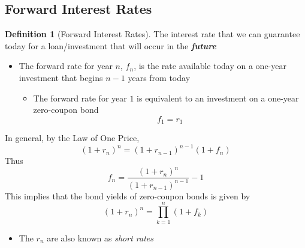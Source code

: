 \documentclass[11pt]{article}
\theoremstyle{definition}
\newtheorem*{definition}{Definition}
\begin{document}
\subsection{Forward Interest Rates}
\begin{definition}[Forward Interest Rates]
    The interest rate that we can guarantee today for a loan/investment that will occur in the \textbf{\textit{future}}
\end{definition}
\begin{itemize}
    \item The forward rate for year $n$, $f_n$, is the rate available today on a one-year investment that begins $n-1$ years from today
    \begin{itemize}
        \item The forward rate for year $1$ is equivalent to an investment on a one-year zero-coupon bond
        \begin{equation*}
            f_1 = r_1
        \end{equation*}
    \end{itemize}
\end{itemize}
In general, by the Law of One Price,
\begin{equation*}
    (1 + r_n)^n = (1 + r_{n-1})^{n-1}(1 + f_n)
\end{equation*}
Thus
\begin{equation*}
    f_n = \frac{(1 + r_n)^n}{(1 + r_{n-1})^{n-1}} - 1
\end{equation*}
This implies that the bond yields of zero-coupon bonds is given by
\begin{equation*}
    (1 + r_n)^n = \prod_{k=1}^n (1 + f_k)
\end{equation*}
\begin{itemize}
    \item The $r_n$ are also known as \textit{short rates}
\end{itemize}
\end{document}
